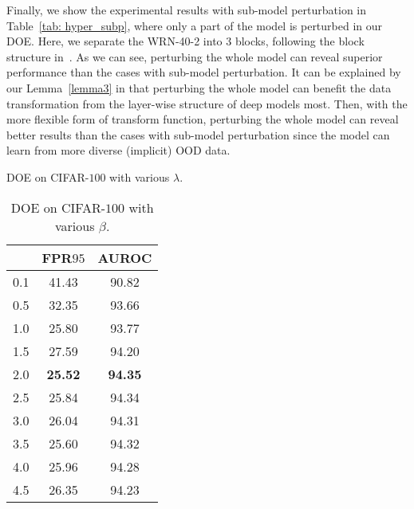 \documentclass{article} \usepackage{iclr2022_conference,times}
\begin{document}
Finally, we show the experimental results with sub-model perturbation in Table~\ref{tab: hyper_subp}, where only a part of the model is perturbed in our DOE. Here, we separate the WRN-40-2 into 3 blocks, following the block structure in~\citep{zagoruyko2016wide}. As we can see, perturbing the whole model can reveal superior performance than the cases with sub-model perturbation. It can be explained by our Lemma~\ref{lemma3} in that perturbing the whole model can benefit the data transformation from the layer-wise structure of deep models most. Then, with the more flexible form of transform function, perturbing the whole model can reveal better results than the cases with sub-model perturbation since the model can learn from more diverse (implicit) OOD data. 

\begin{table}[t]
\centering
\parbox{.23\linewidth}{
\centering
\scriptsize
\caption{DOE on CIFAR-$100$ with various $\lambda$.} \label{tab: hyper_lamb}
\vspace{5pt}
{
\begin{tabular}{c|cc}
\toprule[1.5pt]
                  & FPR$95$                & AUROC                  \\
\midrule[0.6pt]
0.1               & 41.43                  & 90.82                  \\
0.5               & 32.35                  & 93.66                  \\
1.0               & 25.80                  & 93.77                  \\
1.5               & 27.59                  & 94.20                  \\
\cellcolor{greyL}2.0               & \cellcolor{greyL}\textbf{25.52}                  & \cellcolor{greyL}\textbf{94.35}                  \\
2.5               & 25.84                  & 94.34                  \\
3.0               & 26.04                  & 94.31                  \\
3.5               & 25.60                  & 94.32                  \\
4.0               & 25.96                  & 94.28                  \\
4.5               & 26.35                  & 94.23                  \\
\bottomrule[1.5pt]      
\end{tabular}
}}~~
\parbox{.23\linewidth}{
\centering
\scriptsize
\caption{DOE on CIFAR-$100$ with various $\beta$.} \label{tab: hyper_beta}
}
\end{table}
\end{document}
